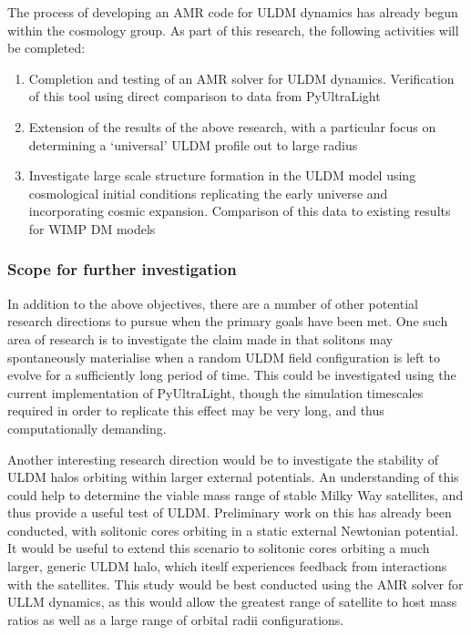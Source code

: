 The process of developing an AMR code for ULDM dynamics has already begun within the cosmology group. As part of this research, the following activities will be completed:

\begin{enumerate}
    \item Completion and testing of an AMR solver for ULDM dynamics. Verification of this tool using direct comparison to data from PyUltraLight
    \item Extension of the results of the above research, with a particular focus on determining a `universal' ULDM profile out to large radius
    \item Investigate large scale structure formation in the ULDM model using cosmological initial conditions replicating the early universe and incorporating cosmic expansion. Comparison of this data to existing results for WIMP DM models
\end{enumerate}

\subsubsection{Scope for further investigation}\label{additional}

In addition to the above objectives, there are a number of other potential research directions to pursue when the primary goals have been met. One such area of research is to investigate the claim made in \cite{Levkov:2018kau} that solitons may spontaneously materialise when a random ULDM field configuration is left to evolve for a sufficiently long period of time. This could be investigated using the current implementation of PyUltraLight, though the simulation timescales required in order to replicate this effect may be very long, and thus computationally demanding. 

Another interesting research direction would be to investigate the stability of ULDM halos orbiting within larger external potentials. An understanding of this could help to determine the viable mass range of stable Milky Way satellites, and thus provide a useful test of ULDM. Preliminary work on this has already been conducted, with solitonic cores orbiting in a static external Newtonian potential. It would be useful to extend this scenario to solitonic cores orbiting a much larger, generic ULDM halo, which iteslf experiences feedback from interactions with the satellites. This study would be best conducted using the AMR solver for ULLM dynamics, as this would allow the greatest range of satellite to host mass ratios as well as a large range of orbital radii configurations. 

